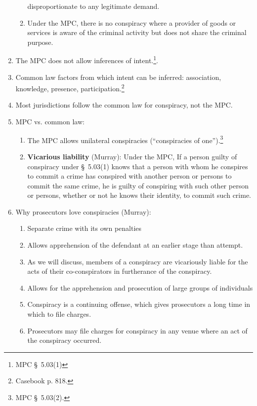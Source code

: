 \begin{enumerate}
\begin{enumerate}
        disproportionate to any legitimate demand.
        \item Under the MPC, there is no conspiracy where a provider of goods 
        or services is aware of the criminal activity but does not share the 
        criminal purpose.
    \end{enumerate}
    \item The MPC does not allow inferences of intent.\footnote{MPC \S\ 
    5.03(1)}. %
    \item Common law factors from which intent can be inferred: association, 
    knowledge, presence, participation.\footnote{Casebook p. 818.}
    \item Most jurisdictions follow the common law for conspiracy, not the 
    MPC.
    \item MPC vs. common law:
    \begin{enumerate}
        \item The MPC allows unilateral conspiracies (``conspiracies of 
        one'').\footnote{MPC \S\ 5.03(2).}
        \item \textbf{Vicarious liability} (Murray): Under the MPC, If a person guilty of 
        conspiracy under \S\ 5.03(1) knows that a person with whom he conspires to 
        commit a crime has conspired with another person or persons to commit the 
        same crime, he is guilty of conspiring with such other person or persons, 
        whether or not he knows their identity, to commit such crime.
    \end{enumerate}
    \item Why prosecutors love conspiracies (Murray):
    \begin{enumerate}
        \item Separate crime with its own penalties
        \item Allows apprehension of the defendant at an earlier stage than 
        attempt.
        \item As we will discuss, members of a conspiracy are vicariously 
        liable for the acts of their co-conspirators in furtherance of the 
        conspiracy.
        \item Allows for the apprehension and prosecution of large groups of 
        individuals \item Conspiracy is a continuing offense, which gives 
        prosecutors a long time in which to file charges.
        \item Prosecutors may file charges for conspiracy in any venue where 
        an act of the conspiracy occurred.

\end{enumerate}
\end{enumerate}
